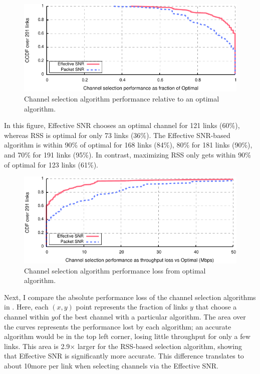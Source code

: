 \begin{figure}[htp]
	\centering
	\includegraphics[width=\textwidth]{figures/applications/chan_sel_ratio_opt.pdf}
	\caption{\label{fig:chan_sel_ratio_opt}Channel selection algorithm performance relative to an optimal algorithm.}
\end{figure}

In this figure, Effective SNR chooses an optimal channel for 121 links (60\%), whereas RSS is optimal for only 73 links (36\%). The Effective SNR-based algorithm is within 90\% of optimal for 168 links (84\%), 80\% for 181 links (90\%), and 70\% for 191 links (95\%). In contrast, maximizing RSS only gets within 90\% of optimal for 123 links (61\%).

\begin{figure}[htp]
	\centering
	\includegraphics[width=\textwidth]{figures/applications/chan_sel_diff_opt.pdf}
	\caption{\label{fig:chan_sel_delta_opt}Channel selection algorithm performance loss from optimal algorithm.}
\end{figure}

Next, I compare the absolute performance loss of the channel selection algorithms in . Here, each $(x,y)$ point represents the fraction of links $y$ that choose a channel within $y$\Mbps of the best channel with a particular algorithm. The area over the curves represents the performance lost by each algorithm; an accurate algorithm would be in the top left corner, losing little throughput for only a few links. This area is 2.9$\times$ larger for the RSS-based selection algorithm, showing that Effective SNR is significantly more accurate. This difference translates to about 10\Mbps more per link when selecting channels via the Effective SNR\@.

